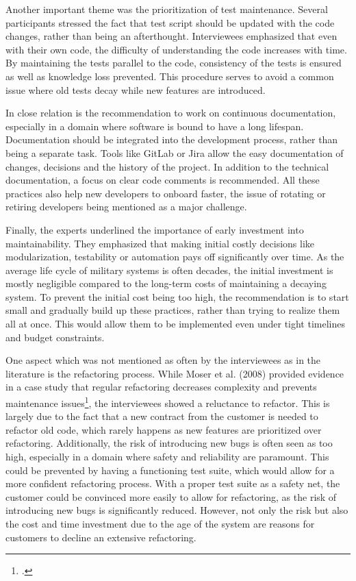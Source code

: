 Another important theme was the prioritization of test maintenance. Several participants stressed the fact that test script should be updated with the code changes, rather than being an afterthought.
Interviewees emphasized that even with their own code, the difficulty of understanding the code increases with time. By maintaining the tests parallel to the code, consistency of the tests is ensured as well as knowledge loss prevented.
This procedure serves to avoid a common issue where old tests decay while new features are introduced.

In close relation is the recommendation to work on continuous documentation, especially in a domain where software is bound to have a long lifespan. Documentation should be integrated into the development process, rather than being a separate task.
Tools like GitLab or Jira allow the easy documentation of changes, decisions and the history of the project. In addition to the technical documentation, a focus on clear code comments is recommended.
All these practices also help new developers to onboard faster, the issue of rotating or retiring developers being mentioned as a major challenge.

Finally, the experts underlined the importance of early investment into maintainability. They emphasized that making initial costly decisions like modularization, testability or automation pays off significantly over time.
As the average life cycle of military systems is often decades, the initial investment is mostly negligible compared to the long-term costs of maintaining a decaying system.
To prevent the initial cost being too high, the recommendation is to start small and gradually build up these practices, rather than trying to realize them all at once. This would allow them to be implemented even under tight timelines and budget constraints.

One aspect which was not mentioned as often by the interviewees as in the literature is the refactoring process. While Moser et al. (2008) provided evidence in a case study that regular refactoring decreases complexity and prevents maintenance issues\footcite[262]{moserCaseStudyImpact2008}, the interviewees showed a reluctance to refactor.
This is largely due to the fact that a new contract from the customer is needed to refactor old code, which rarely happens as new features are prioritized over refactoring. Additionally, the risk of introducing new bugs is often seen as too high, especially in a domain where safety and reliability are paramount.
This could be prevented by having a functioning test suite, which would allow for a more confident refactoring process. With a proper test suite as a safety net, the customer could be convinced more easily to allow for refactoring, as the risk of introducing new bugs is significantly reduced. However, not only the risk but also the cost and time investment due to the age of the system are reasons for customers to decline an extensive refactoring.

